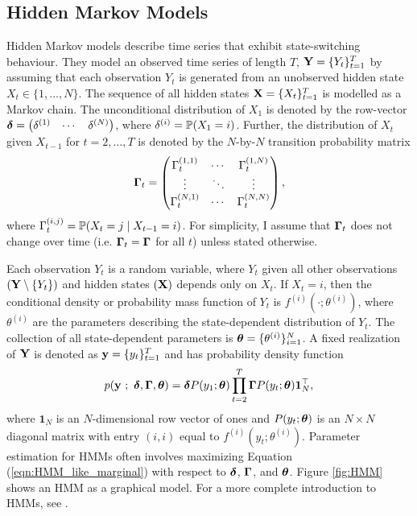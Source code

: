 \subsection{Hidden Markov Models}

Hidden Markov models describe time series that exhibit state-switching behaviour. They model an observed time series of length $T$, $\mathbf{Y} = \{Y_t\}_{t=1}^T$ by assuming that each observation $Y_t$ is generated from an unobserved hidden state $X_t \in \{1,\ldots,N\}$. The sequence of all hidden states $\mathbf{X} = \{X_t\}_{t=1}^T$ is modelled as a Markov chain. The unconditional distribution of $X_1$ is denoted by the row-vector $\boldsymbol{\delta} = \begin{pmatrix} \delta^{(1)} & \cdots & \delta^{(N)} \end{pmatrix}$, where $\delta^{(i)} = \mathbb{P}(X_1 = i)$. Further, the distribution of $X_t$ given $X_{t-1}$ for $t = 2,\ldots,T$ is denoted by the $N$-by-$N$ transition probability matrix 
%
\begin{equation}
    \boldsymbol{\Gamma}_t = \begin{pmatrix} 
    \Gamma_t^{(1,1)} & \cdots & \Gamma_t^{(1,N)} \\
    \vdots & \ddots & \vdots \\
    \Gamma_t^{(N,1)} & \cdots & \Gamma_t^{(N,N)} \\
    \end{pmatrix},
\end{equation}
%
where $\Gamma_t^{(i,j)} = \mathbb{P}(X_t = j \mid X_{t-1} = i)$. For simplicity, I assume that $\boldsymbol{\Gamma}_t$ does not change over time (i.e. $\boldsymbol{\Gamma}_t = \boldsymbol{\Gamma}$ for all $t$) unless stated otherwise. 

Each observation $Y_t$ is a random variable, where $Y_t$ given all other observations $(\mathbf{Y} \setminus \{Y_t\})$ and hidden states $(\mathbf{X})$ depends only on $X_t$. If $X_t=i$, then the conditional density or probability mass function of $Y_t$ is $f^{(i)}(\cdot ; \theta^{(i)})$, where $\theta^{(i)}$ are the parameters describing the state-dependent distribution of $Y_t$. The collection of all state-dependent parameters is $\boldsymbol{\theta} = \{\theta^{(i)}\}_{i=1}^N$. A fixed realization of $\mathbf{Y}$ is denoted as $\mathbf{y} = \{y_t\}_{t=1}^T$ and has probability density function
%
\begin{equation}
    p(\mathbf{y} ~;~ \boldsymbol{\delta},\boldsymbol{\Gamma},\boldsymbol{\theta}) = \boldsymbol{\delta} P(y_1;\boldsymbol{\theta}) \prod_{t=2}^T \boldsymbol{\Gamma} P(y_t;\boldsymbol{\theta}) \mathbf{1}^\top_N, 
    \label{eqn:HMM_like_marginal}
\end{equation}
%
where $\mathbf{1}_N$ is an $N$-dimensional row vector of ones and $P(y_t;\boldsymbol{\theta})$ is an $N \times N$ diagonal matrix with entry $(i,i)$ equal to $f^{(i)}(y_t; \theta^{(i)})$. Parameter estimation for HMMs often involves maximizing Equation (\ref{eqn:HMM_like_marginal}) with respect to $\boldsymbol{\delta}$, $\boldsymbol{\Gamma}$, and $\boldsymbol{\theta}$. Figure \ref{fig:HMM} shows an HMM as a graphical model. For a more complete introduction to HMMs, see \citet{Zucchini:2016}. 

